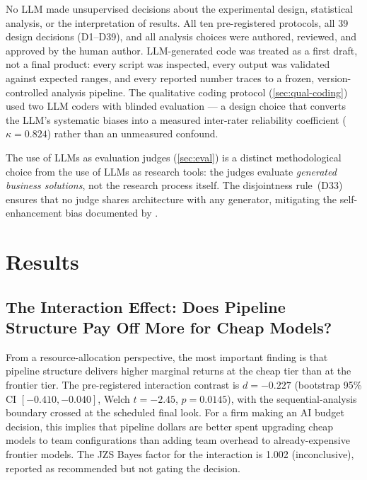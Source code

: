\documentclass[12pt,a4paper]{article}
\begin{document}
No LLM made unsupervised decisions about the experimental design, statistical
analysis, or the interpretation of results. All ten pre-registered protocols,
all 39 design decisions (D1--D39), and all analysis choices were authored,
reviewed, and approved by the human author. LLM-generated code was treated as a
first draft, not a final product: every script was inspected, every output was
validated against expected ranges, and every reported number traces to a frozen,
version-controlled analysis pipeline. The qualitative coding protocol
(\cref{sec:qual-coding}) used two LLM coders with blinded evaluation --- a
design choice that converts the LLM's systematic biases into a measured
inter-rater reliability coefficient ($\kappa = 0.824$) rather than an unmeasured
confound.

The use of LLMs as evaluation judges (\cref{sec:eval}) is a distinct
methodological choice from the use of LLMs as research tools: the judges
evaluate \emph{generated business solutions}, not the research process itself.
The disjointness rule~(D33) ensures that no judge shares architecture with any
generator, mitigating the self-enhancement bias documented by
\citet{ZhengEtAl2023}.

\section{Results}\label{sec:results}

\subsection{The Interaction Effect: Does Pipeline Structure Pay Off More for
Cheap Models?}\label{sec:interaction}

From a resource-allocation perspective, the most important finding is that
pipeline structure delivers higher marginal returns at the cheap tier than at
the frontier tier. The pre-registered interaction contrast is $d = -0.227$
(bootstrap 95\% CI $[-0.410, -0.040]$, Welch $t = -2.45$, $p = 0.0145$), with
the sequential-analysis boundary crossed at the scheduled final look. For a
firm making an AI budget decision, this implies that pipeline dollars are better
spent upgrading cheap models to team configurations than adding team overhead to
already-expensive frontier models. The JZS Bayes factor for the interaction is
1.002 (inconclusive), reported as recommended but not gating the decision.
\end{document}
